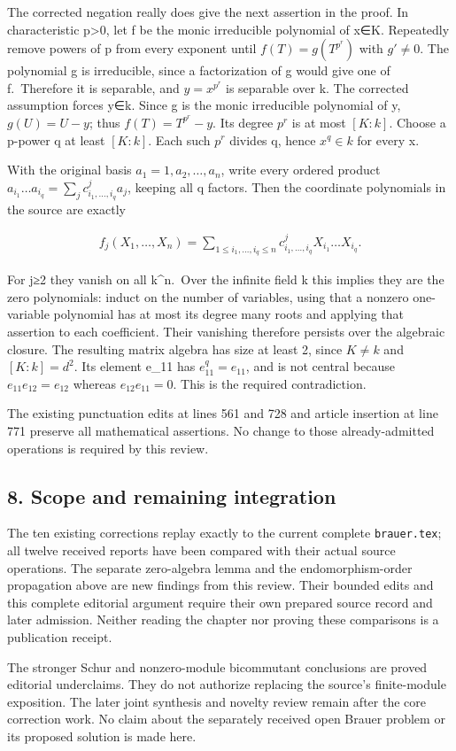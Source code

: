 The corrected negation really does give the next assertion in the proof. In characteristic p\textgreater0, let f be the monic irreducible polynomial of x∈K. Repeatedly remove powers of p from every exponent until \(f(T)=g(T^{p^r})\) with \(g'\ne 0\). The polynomial g is irreducible, since a factorization of g would give one of f.~Therefore it is separable, and \(y=x^{p^r}\) is separable over k. The corrected assumption forces y∈k. Since g is the monic irreducible polynomial of y, \(g(U)=U-y\); thus \(f(T)=T^{p^r}-y\). Its degree \(p^r\) is at most \([K:k]\). Choose a p-power q at least \([K:k]\). Each such \(p^r\) divides q, hence \(x^q\in k\) for every x.

With the original basis \(a_{1}=1,a_{2},\ldots ,a_{n}\), write every ordered product \(a_{i_{1}}\ldots a_{i_{q}}=\sum _{j} c^j_{i_{1},\ldots ,i_{q}}a_{j}\), keeping all q factors. Then the coordinate polynomials in the source are exactly

\[\begin{gathered}
f_{j}(X_{1},\ldots ,X_{n})=\sum _{1\leq i_{1},\ldots ,i_{q}\leq n} c^j_{i_{1},\ldots ,i_{q}} X_{i_{1}}\ldots X_{i_{q}}.
\end{gathered}\]

For j≥2 they vanish on all k\^{}n.~Over the infinite field k this implies they are the zero polynomials: induct on the number of variables, using that a nonzero one-variable polynomial has at most its degree many roots and applying that assertion to each coefficient. Their vanishing therefore persists over the algebraic closure. The resulting matrix algebra has size at least 2, since \(K\ne k\) and \([K:k]=d^{2}\). Its element e\_11 has \(e_{11}^q=e_{11}\), and is not central because \(e_{11} e_{12}=e_{12}\) whereas \(e_{12} e_{11}=0\). This is the required contradiction.

The existing punctuation edits at lines 561 and 728 and article insertion at line 771 preserve all mathematical assertions. No change to those already-admitted operations is required by this review.

\subsection{8. Scope and remaining integration}\label{scope-and-remaining-integration}

The ten existing corrections replay exactly to the current complete \texttt{brauer.tex}; all twelve received reports have been compared with their actual source operations. The separate zero-algebra lemma and the endomorphism-order propagation above are new findings from this review. Their bounded edits and this complete editorial argument require their own prepared source record and later admission. Neither reading the chapter nor proving these comparisons is a publication receipt.

The stronger Schur and nonzero-module bicommutant conclusions are proved editorial underclaims. They do not authorize replacing the source's finite-module exposition. The later joint synthesis and novelty review remain after the core correction work. No claim about the separately received open Brauer problem or its proposed solution is made here.
